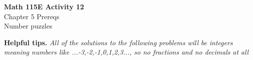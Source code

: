 \documentclass[12pt]{article}
\begin{document}
\begin{center}
    \Large \textbf{Math 115E Activity 12} \\
    \vspace{0.2cm}
    \normalsize Chapter 5 Prereqs \\
    \normalsize Number puzzles
\end{center}

\begin{tcolorbox}[
    width=\linewidth,
    colframe=black,         %
    colback=white,          %
    boxrule=0.5pt,          %
    left=1mm, right=1.1mm,    %
    top=1mm, bottom=1mm,    %
    arc=2mm                 %
]
\textbf{Helpful tips.} 
\textit{All of the solutions to the following problems will be integers\\
meaning numbers like ...-3,-2,-1,0,1,2,3..., so no fractions and no decimals at all}
\end{tcolorbox}
\end{document}
